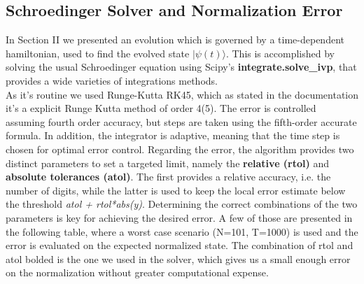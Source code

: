 \documentclass[11pt, twoside]{report}
\begin{document}
\subsection{Schroedinger Solver and Normalization Error}
In Section II we presented an evolution which is governed by a time-dependent hamiltonian, used to find the evolved state $|\psi(t)\rangle$. This is accomplished by solving the usual Schroedinger equation using Scipy's \textbf{integrate.solve\_ivp}, that provides a wide varieties of integrations methods. \\

As it's routine we used Runge-Kutta RK45, which as stated in the documentation it's a explicit Runge Kutta method of order 4(5). The error is controlled assuming fourth order accuracy, but steps are taken using the fifth-order accurate formula. In addition, the integrator is adaptive, meaning that the time step is chosen for optimal error control. Regarding the error, the algorithm provides two distinct parameters to set a targeted limit, namely the \textbf{relative (rtol)} and \textbf{absolute tolerances (atol)}. The first provides a relative accuracy, i.e. the number of digits, while the latter is used to keep the local error estimate below the threshold \textit{atol + rtol*abs(y)}. Determining the correct combinations of the two parameters is key for achieving the desired error. A few of those are presented in the following table, where a worst case scenario (N=101, T=1000) is used and the error is evaluated on the expected normalized state. The combination of rtol and atol bolded is the one we used in the solver, which gives us a small enough error on the normalization without greater computational expense.\\

\newpage
{}

\end{document}

